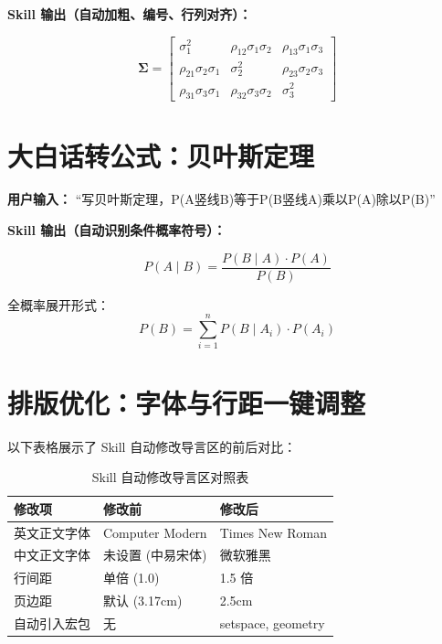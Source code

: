 \documentclass[12pt,a4paper]{ctexart}
\begin{document}
\textbf{Skill 输出（自动加粗、编号、行列对齐）：}

\begin{equation}
    \boldsymbol{\Sigma} =
    \begin{bmatrix}
        \sigma_1^{2} & \rho_{12}\sigma_1\sigma_2 & \rho_{13}\sigma_1\sigma_3 \\[6pt]
        \rho_{21}\sigma_2\sigma_1 & \sigma_2^{2} & \rho_{23}\sigma_2\sigma_3 \\[6pt]
        \rho_{31}\sigma_3\sigma_1 & \rho_{32}\sigma_3\sigma_2 & \sigma_3^{2}
    \end{bmatrix}
    \label{eq:cov}
\end{equation}

\section{大白话转公式：贝叶斯定理}

\textbf{用户输入：} ``写贝叶斯定理，P(A竖线B)等于P(B竖线A)乘以P(A)除以P(B)''

\textbf{Skill 输出（自动识别条件概率符号）：}

\begin{equation}
    P(A \mid B) = \frac{P(B \mid A) \cdot P(A)}{P(B)}
    \label{eq:bayes}
\end{equation}

全概率展开形式：
\begin{equation}
    P(B) = \sum_{i=1}^{n} P(B \mid A_i) \cdot P(A_i)
    \label{eq:totalprob}
\end{equation}

\section{排版优化：字体与行距一键调整}

以下表格展示了 Skill 自动修改导言区的前后对比：

\begin{table}[h]
\centering
\caption{Skill 自动修改导言区对照表}
\begin{tabular}{@{}lll@{}}
\toprule
\textbf{修改项} & \textbf{修改前} & \textbf{修改后} \\
\midrule
英文正文字体 & Computer Modern & Times New Roman \\
中文正文字体 & 未设置 (中易宋体) & 微软雅黑 \\
行间距       & 单倍 (1.0)      & 1.5 倍 \\
页边距       & 默认 (3.17cm)   & 2.5cm \\
自动引入宏包 & 无              & setspace, geometry \\
\bottomrule
\end{tabular}
\end{table}
\end{document}
